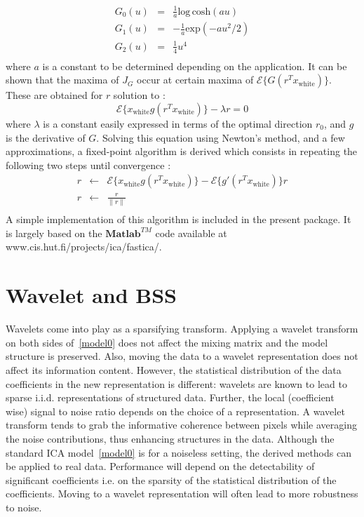 \begin{eqnarray}
G_0 (u)  & = &  \frac{1}{a} \textrm{log}\,\textrm{cosh} (a u ) \nonumber    \\
G_1 (u)  & = &  -\frac{1}{a} \textrm{exp}(- a u^2 / 2 )   \nonumber	   \\
G_2 (u)  & = &  \frac{1}{4} u^4 \nonumber    \\
\end{eqnarray}
where $a$ is a constant to be determined depending on the application. It can be shown that the maxima of $J_G$ occur at certain maxima 
of $\mathcal{E} \{ G(r^T x_{\textrm{white}} ) \} $. These are obtained for $r$ solution to :
\begin{equation}
\mathcal{E} \{ x_{\textrm{white}} g(r^T x_{\textrm{white}}  ) \} - \lambda r = 0 
\end{equation}
where $\lambda$ is a constant easily expressed in terms of the optimal direction $r_0$, and $g$ is the derivative of $G$. Solving this 
equation using Newton's method, and a few approximations, a fixed-point algorithm is derived which consists in repeating the 
following two steps until convergence :
\begin{eqnarray}
r  & \leftarrow & \mathcal{E} \{ x_{\textrm{white}} g(r^T x_{\textrm{white}}  ) \} - \mathcal{E} \{ g'(r^T x_{\textrm{white}}  ) \} r     \nonumber  \\
r  & \leftarrow  &  \frac{r}{\| r \|}   \nonumber	   \\
\end{eqnarray}
A simple implementation of this algorithm is included in the present package. It is largely based on the $\textbf{Matlab}^{TM}$ code 
available at www.cis.hut.fi/projects/ica/fastica/. 

 
\section{Wavelet and BSS} 

\label{sec:wjade}

Wavelets come into play as a sparsifying transform. Applying a wavelet transform on both sides of~\eqref{model0} does not affect the 
mixing matrix and the model structure is preserved. Also, moving the data to a wavelet representation does not affect its information 
content. However, the statistical distribution of the data coefficients in the new representation is different: wavelets are known to 
lead to sparse i.i.d. representations of structured data. Further, the local (coefficient wise) signal to noise ratio 
depends on the choice of a representation. A wavelet transform tends to grab the informative coherence between pixels while averaging 
the noise contributions, thus enhancing structures in the data. Although the standard ICA model~\eqref{model0} is for a noiseless setting, 
the derived methods can be applied to real data. Performance will depend on the detectability of significant coefficients i.e. on 
the sparsity of the statistical distribution of the coefficients. Moving to a wavelet representation will often lead to more robustness to noise.    


